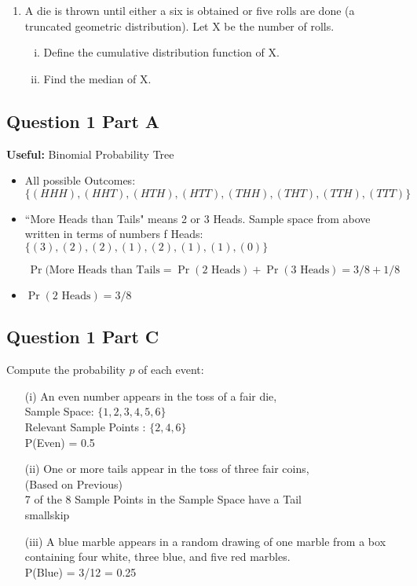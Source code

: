 \documentclass[a4paper,12pt]{article}
\begin{document}
\begin{enumerate}
	
	\item	A die is thrown until either a six is obtained or five rolls are done (a truncated geometric distribution). Let X be the number of rolls.
	\begin{enumerate}[(i)]
		\item 	Define the cumulative distribution function of X.
		\item	Find the median of X.
	\end{enumerate}	
	

	
	
	

\end{enumerate}

	\subsection*{Question 1 Part A}
	
	\noindent \textbf{Useful:} Binomial Probability Tree 
	\begin{itemize}
		\item All possible Outcomes:
		$\{ (HHH), (HHT), (HTH), (HTT) , (THH), (THT), (TTH),(TTT)\} $
		
		
		
		\item ``More Heads than Tails" means 2 or 3 Heads. Sample space from above written in terms of numbers f Heads: $\{ (3), (2), (2), (1), (2),(1),(1),(0)\} $
		
		\[ \Pr(\mbox{More Heads than Tails} = \Pr(\mbox{2 Heads}) + \Pr(\mbox{3 Heads}) = 3/8 + 1/8 \]
		
		\item $ \Pr(\mbox{2 Heads}) = 3/8 $
		
	\end{itemize}
	
	
	

	\subsection*{Question 1 Part C}
	Compute the probability $p$ of each event:
	\begin{itemize}
		\item[(i)] An even number appears in the toss of a fair die,
		\\
		Sample Space: $\{1,2,3,4,5,6\}$
		\\
		Relevant Sample Points : $\{2,4,6\}$
		\\ P(Even) = 0.5
		\\ \smallskip
		\item[(ii)] One or more tails appear in the toss of three fair coins,
		\\ (Based on Previous)
		\\ 7 of the 8 Sample Points in the Sample Space have a Tail
		\\ smallskip
		\item[(iii)] A blue marble appears in a random drawing of one marble from a box containing four white, three blue, and five red marbles.
		\\ P(Blue) = 3/12 = 0.25
	\end{itemize}
	
	
	
	
\end{document}
